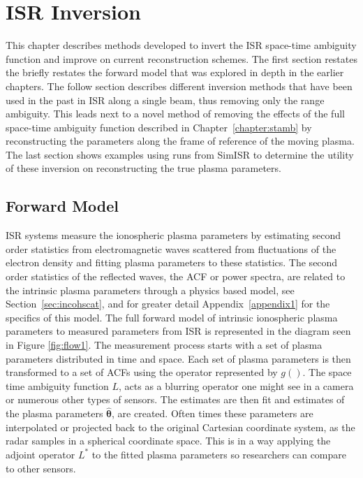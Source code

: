 \chapter{ISR Inversion}
\label{chapter:inversion}
\thispagestyle{myheadings}

\graphicspath{{5_Inversions/Figures/}}

This chapter describes methods developed to invert the ISR space-time ambiguity function and improve on current reconstruction schemes. The first section restates the briefly restates the forward model that was explored in depth in the earlier chapters. The follow section describes different inversion methods that have been used in the past in ISR along a single beam, thus removing only the range ambiguity. This leads next to a novel method of removing the effects of the full space-time ambiguity function described in Chapter~\ref{chapter:stamb} by reconstructing the parameters along the frame of reference of the moving plasma. The last section shows examples using runs from SimISR to determine the utility of these inversion on reconstructing the true plasma parameters.

\section{Forward Model}

ISR systems measure the ionospheric plasma parameters by estimating second order statistics from electromagnetic waves scattered from fluctuations of the electron density and fitting plasma parameters to these statistics. The second order statistics of the reflected waves, the ACF or power spectra, are related to the intrinsic plasma parameters through a physics based model, see Section~\ref{sec:incohscat}, and for greater detail Appendix~\ref{appendix1} for the specifics of this model. The full forward model of intrinsic ionospheric plasma parameters to measured parameters from ISR is represented in the diagram seen in Figure \ref{fig:flow1}. The measurement process starts with a set of plasma parameters distributed in time and space. Each set of plasma parameters is then transformed to a set of ACFs using the operator represented by $g()$. The space time ambiguity function $L$, acts as a blurring operator one might see in a camera or numerous other types of sensors. The estimates are then fit and estimates of the plasma parameters $\widehat{\boldsymbol{\theta}}$, are created. Often times these parameters are interpolated or projected back to the original Cartesian coordinate system, as the radar samples in a spherical coordinate space. This is in a way applying the adjoint operator $L^*$ to the fitted plasma parameters so researchers can compare to other sensors.

